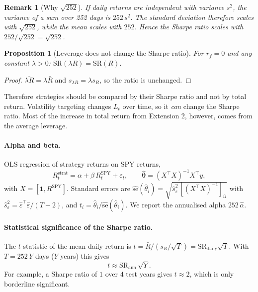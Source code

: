 \documentclass[11pt,a4paper]{article}
\newtheorem*{remark}{Remark}
\newtheorem*{prop}{Proposition}
\newcommand{\1}{\mathbf{1}}
\begin{document}
\begin{remark}[Why $\sqrt{252}$]
If daily returns are independent with variance $s^2$, the variance of a sum over 252 days is $252\,s^2$.
The standard deviation therefore scales with $\sqrt{252}$, while the mean scales with $252$. Hence the
Sharpe ratio scales with $252/\sqrt{252} = \sqrt{252}$.
\end{remark}

\begin{prop}[Leverage does not change the Sharpe ratio]
For $r_f = 0$ and any constant $\lambda>0$: $\mathrm{SR}(\lambda R) = \mathrm{SR}(R)$.
\end{prop}
\begin{proof}
$\overline{\lambda R} = \lambda \bar R$ and $s_{\lambda R} = \lambda s_R$, so the ratio is unchanged.
\end{proof}
\noindent Therefore strategies should be compared by their Sharpe ratio and not by total return.
Volatility targeting changes $L_t$ over time, so it \emph{can} change the Sharpe ratio. Most of the
increase in total return from Extension 2, however, comes from the average leverage.

\paragraph{Alpha and beta.} OLS regression of strategy returns on SPY returns,
\begin{equation}
  R^{\text{strat}}_t = \alpha + \beta\, R^{\text{SPY}}_t + \varepsilon_t,
  \qquad
  \hat{\bm\theta} = (X^\top X)^{-1} X^\top y,
\end{equation}
with $X = [\bm 1, R^{\text{SPY}}]$. Standard errors are
$\widehat{\mathrm{se}}(\hat\theta_i) = \sqrt{\hat s^2_\varepsilon\,[(X^\top X)^{-1}]_{ii}}$ with
$\hat s^2_\varepsilon = \hat\varepsilon^\top\hat\varepsilon/(T-2)$, and $t_i = \hat\theta_i/\widehat{\mathrm{se}}(\hat\theta_i)$.
We report the annualised alpha $252\,\hat\alpha$.

\paragraph{Statistical significance of the Sharpe ratio.}
The $t$-statistic of the mean daily return is $t = \bar R/(s_R/\sqrt T) = \mathrm{SR}_{\text{daily}}\sqrt{T}$.
With $T = 252\,Y$ days ($Y$ years) this gives
\begin{equation}
  t \approx \mathrm{SR}_{\text{ann}}\,\sqrt{Y}.
\end{equation}
For example, a Sharpe ratio of $1$ over $4$ test years gives $t\approx2$, which is only borderline significant.
\end{document}
